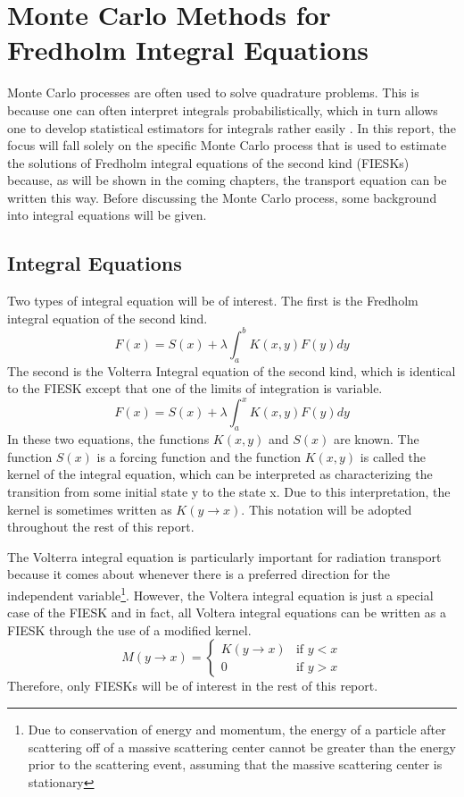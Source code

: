 \chapter{Monte Carlo Methods for Fredholm Integral Equations}
\label{ch:mc_methods}
Monte Carlo processes are often used to solve quadrature problems. This is 
because one can often interpret integrals probabilistically, which in turn 
allows one to develop statistical estimators for integrals rather easily 
\citep{spanier_monte_1969}. In this report, the focus will fall solely on the 
specific Monte Carlo process that is used to estimate the solutions of Fredholm 
integral equations of the second kind (FIESKs) because, as will be shown in the 
coming chapters, the transport equation can be written this way. Before 
discussing the Monte Carlo process, some background into integral equations 
will be given. 

\section{Integral Equations}
\label{sec:integral_equations}
Two types of integral equation will be of interest. The first is the Fredholm 
integral equation of the second kind.
\begin{equation}
  F(x) = S(x) + \lambda \int_a^b K(x,y) F(y)dy
  \label{eq:fredholm_int_eqn}
\end{equation}
The second is the Volterra Integral equation of the second kind, which is 
identical to the FIESK except that one of the limits of integration is variable.
\begin{equation}
  F(x) = S(x) + \lambda \int_a^x K(x,y) F(y) dy
  \label{eq:volterra_int_eqn}
\end{equation}
In these two equations, the functions $K(x,y)$ and $S(x)$ are known. The 
function $S(x)$ is a forcing function and the function $K(x,y)$ is called the 
kernel of the integral equation, which can be interpreted as characterizing the 
transition from some initial state y to the state x. Due to this 
interpretation, the kernel is sometimes written as $K(y \to x)$. This notation 
will be adopted throughout the rest of this report.

The Volterra integral equation is particularly important for radiation 
transport because it comes about whenever there is a preferred direction for the 
independent variable\footnote{Due to conservation of energy and momentum, 
the energy of a particle after scattering off of a massive scattering center 
cannot be greater than the energy prior to the scattering event, assuming that 
the massive scattering center is stationary}. However, the Voltera integral 
equation is just a special case of the FIESK and in fact, all Voltera integral
equations can be written as a FIESK through the use of a modified kernel. 
\begin{equation}
  M(y \to x) = 
  \begin{cases}
    K(y \to x) & \text{if }y < x \\
    0 & \text{if }y > x 
  \end{cases}
\end{equation}
Therefore, only FIESKs will be of interest in the rest of this report.

